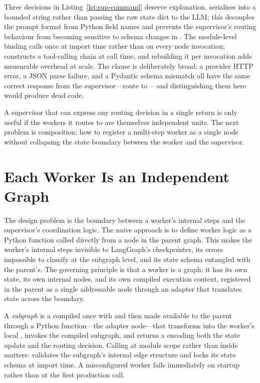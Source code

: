 Three decisions in Listing~\ref{lst:sup-command} deserve explanation.
 serialises  into a
bounded string rather than passing the raw state dict to the LLM; this
decouples the prompt format from Python field names and prevents the
supervisor's routing behaviour from becoming sensitive to schema changes in
. The  module-level binding calls
 once at import time rather than on every
node invocation;  constructs a tool-calling
chain at call time, and rebuilding it per invocation adds measurable
overhead at scale. The  clause
is deliberately broad: a provider HTTP error, a JSON parse failure, and a
Pydantic schema mismatch all have the same correct response from the
supervisor---route to ---and distinguishing them here
would produce dead code.

A supervisor that can express any routing decision in a single 
return is only useful if the workers it routes to are themselves independent
units. The next problem is composition: how to register a multi-step worker
as a single node without collapsing the state boundary between the worker
and the supervisor.


\section{Each Worker Is an Independent Graph}
\label{sec:sup-subgraph}

The design problem is the boundary between a worker's internal steps and
the supervisor's coordination logic. The naive approach is to define worker
logic as a Python function called directly from a node in the parent graph.
This makes the worker's internal steps invisible to LangGraph's
checkpointer, its errors impossible to classify at the subgraph level, and
its state schema entangled with the parent's. The governing principle is
that a worker is a graph: it has its own  state, its own
internal nodes, and its own compiled execution context, registered in the
parent as a single addressable node through an adapter that translates
state across the boundary.

A \emph{subgraph} is a  compiled once with
 and then made available to the parent through
a Python function---the adapter node---that transforms
 into the worker's local , invokes the
compiled subgraph, and returns a  encoding both the state
update and the routing decision. Calling  at module scope
rather than inside  matters:  validates
the subgraph's internal edge structure and locks its state schema at import
time. A misconfigured worker fails immediately on startup rather than at
the first production call.

